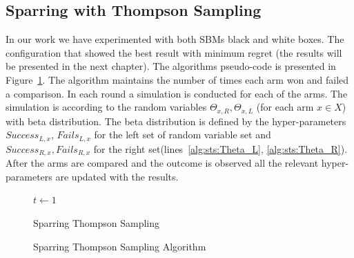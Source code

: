 \documentclass{llncs}
\begin{document}
	\subsection{Sparring with Thompson Sampling}
		In our work  we have experimented with both SBMs black and white boxes. The configuration that showed the best result with minimum regret (the results will be presented in the next chapter). 
		The algorithms pseudo-code is presented in Figure~\ref{algo_SparringTS}.
		The algorithm maintains the number of times each arm won and failed a comparison.
		In each round a simulation is conducted for each of the arms.
		The simulation is according to the random variables $\Theta_{x,R}, \Theta_{x,L}$ (for each arm $x \in X$) with beta distribution. 
		The beta distribution is defined by the hyper-parameters $Success_{L,x}$, $Fails_{L,x}$ for the left set of random variable set and $Success_{R,x}, Fails_{R,x}$ for the right set(lines~\ref{alg:sts:Theta_L}, \ref{alg:sts:Theta_R}).
		After the arms are compared and the outcome is observed all the relevant hyper-parameters are updated with the results.
		
	\begin{figure}[h]
	\IncMargin{1em}
		\begin{algorithm}[H]
		
		\BlankLine
		$t\leftarrow 1$\\
			\caption{Sparring Thompson Sampling}
		\end{algorithm}
		\caption{Sparring Thompson Sampling Algorithm}\label{algo_SparringTS}
	\end{figure}
					
\end{document}
